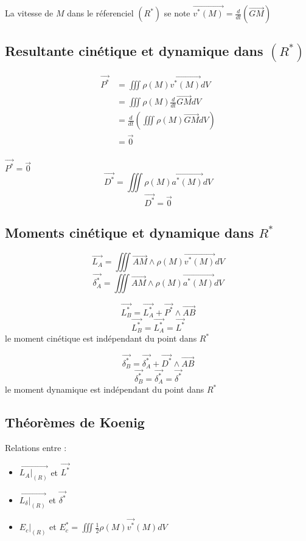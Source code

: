 \documentclass[../main.tex]{subfile}
\begin{document}
\begin{nota}	
	La vitesse de $M$ dans le réferenciel $(R^*)$ se note $\vec{v^*(M)} = \frac{d}{dt}(\vec{GM})$
\end{nota}

\subsection{Resultante cinétique et dynamique dans $(R^*)$}

\begin{defi}
	$$
\begin{aligned}
	\vec{P^*} &= \iiint \rho(M) \vec{v^*(M)} dV\\
	&= \iiint \rho(M) \frac{d}{dt} \vec{GM} dV\\
	&= \frac{d}{dt} (\iiint \rho(M) \vec{GM} dV)\\
	&= \vec{0}\\
\end{aligned}
	$$
\end{defi}

\begin{propri}
	$\vec{P^*} = \vec{0}$\\
	$$\vec{D^*} = \iiint \rho(M) \vec{a^*(M)} dV$$
	$$\vec{D^*} = \vec{0}$$
\end{propri}

\subsection{Moments cinétique et dynamique dans $R^*$}

\begin{defi}
	$$\vec{L_A} = \iiint \vec{AM} \wedge \rho(M) \vec{v^*(M)} dV$$
	$$\vec{\delta^*_A} = \iiint \vec{AM} \wedge \rho(M) \vec{a^*(M)} dV$$
\end{defi}

\begin{propri}
	$$\vec{L^*_B} = \vec{L^*_A} + \vec{P^*} \wedge \vec{AB}$$
	$$\vec{L^*_B} = \vec{L^*_A} = \vec{L^*}$$
	le moment cinétique est indépendant du point dans $R^*$

	$$\vec{\delta^*_B} = \vec{\delta^*_A} + \vec{D^*} \wedge \vec{AB}$$
	$$\vec{\delta^*_B} = \vec{\delta^*_A} = \vec{\delta^*}$$
	le moment dynamique est indépendant du point dans $R^*$
\end{propri}

\subsection{Théorèmes de Koenig}
\begin{theo}
	Relations entre :\\
\begin{itemize}	
	\item $\vec{L_A |_{(R)}}$ et $\vec{L^*}$
	\item $\vec{L_\delta |_{(R)}}$ et $\vec{\delta^*}$
	\item $E_c |_{(R)}$ et $E_c^* = \iiint \frac{1}{2} \rho(M) \vec{v^*}(M) dV$
\end{itemize}
\end{theo}
\end{document}
